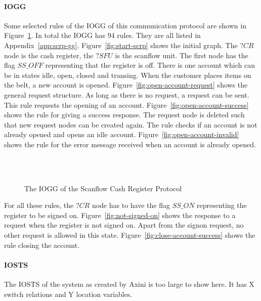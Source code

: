 \paragraph*{IOGG} Some selected rules of the IOGG of this communication protocol are shown in Figure~\ref{fig:gg-scrp}. In total the IOGG has 94 rules. They are all listed in Appendix~\ref{app:scrp-gg}. Figure~\ref{fig:start-scrp} shows the initial graph. The $?CR$ node is the cash register, the $?SFU$ is the scanflow unit. The first node has the flag $\mathit{SS\_OFF}$ representing that the register is off. There is one account which can be in states idle, open, closed and transing. When the customer places items on the belt, a new account is opened. Figure~\ref{fig:open-account-request} shows the general request structure. As long as there is no request, a request can be sent. This rule requests the opening of an account. Figure~\ref{fig:open-account-success} shows the rule for giving a success response. The request node is deleted such that new request nodes can be created again. The rule checks if an account is not already opened and opens an idle account. Figure~\ref{fig:open-account-invalid} shows the rule for the error message received when an account is already opened. 

\begin{figure}[ht]
  \begin{center}
    \hspace{20px}
    \\
    \hspace{20px}
    \\
    \hspace{20px}
  \end{center}
  \caption{The IOGG of the Scanflow Cash Register Protocol}
  \label{fig:gg-scrp}
\end{figure}

For all these rules, the $?CR$ node has to have the flag $\mathit{SS\_ON}$ representing the register to be signed on. Figure~\ref{fig:not-signed-on} shows the response to a request when the register is not signed on. Apart from the signon request, no other request is allowed in this state. Figure~\ref{fig:close-account-success} shows the rule closing the account.

\paragraph*{IOSTS} The IOSTS of the system as created by Axini is too large to show here. It has X switch relations and Y location variables.